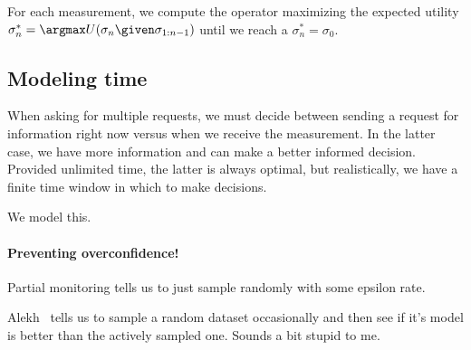 For each measurement, we compute the operator maximizing the expected utility $\sigma_n^* = \argmax U(\sigma_n \given \sigma_{1:n-1})$ until we reach a $\sigma_n^* = \sigma_0$.


\subsection{Modeling time}
\label{sec:time}

When asking for multiple requests, we must decide between sending a request for information right now versus when we receive the measurement.
In the latter case, we have more information and can make a better informed decision.
Provided unlimited time, the latter is always optimal, but realistically, we have a finite time window in which to make decisions.

We model this.

\paragraph{Preventing overconfidence!}
Partial monitoring tells us to just sample randomly with some epsilon rate.

Alekh~\cite{agarwal2013selective} tells us to sample a random dataset occasionally and then see if it's model is better than the actively sampled one. Sounds a bit stupid to me.

